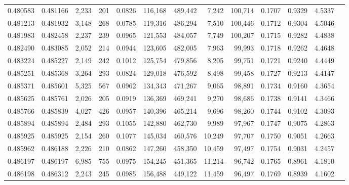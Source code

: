 \begin{tabular}{rrrrrrrrrrrrr}
0.480583 & 0.481166 &  2,233 &   201 &                                     0.0826 & 116,168 & 489,442 &   7,242 & 100,714 & 0.1707 & 0.9329 & 4.5337 \\
0.481213 & 0.481932 &  3,148 &   268 &                                     0.0785 & 119,316 & 486,294 &   7,510 & 100,446 & 0.1712 & 0.9304 & 4.5046 \\
0.481983 & 0.482458 &  2,237 &   239 &                                     0.0965 & 121,553 & 484,057 &   7,749 & 100,207 & 0.1715 & 0.9282 & 4.4838 \\
0.482490 & 0.483085 &  2,052 &   214 &                                     0.0944 & 123,605 & 482,005 &   7,963 &  99,993 & 0.1718 & 0.9262 & 4.4648 \\
0.483224 & 0.485227 &  2,149 &   242 &                                     0.1012 & 125,754 & 479,856 &   8,205 &  99,751 & 0.1721 & 0.9240 & 4.4449 \\
0.485251 & 0.485368 &  3,264 &   293 &                                     0.0824 & 129,018 & 476,592 &   8,498 &  99,458 & 0.1727 & 0.9213 & 4.4147 \\
0.485371 & 0.485601 &  5,325 &   567 &                                     0.0962 & 134,343 & 471,267 &   9,065 &  98,891 & 0.1734 & 0.9160 & 4.3654 \\
0.485625 & 0.485761 &  2,026 &   205 &                                     0.0919 & 136,369 & 469,241 &   9,270 &  98,686 & 0.1738 & 0.9141 & 4.3466 \\
0.485766 & 0.485839 &  4,027 &   426 &                                     0.0957 & 140,396 & 465,214 &   9,696 &  98,260 & 0.1744 & 0.9102 & 4.3093 \\
0.485894 & 0.485894 &  2,484 &   293 &                                     0.1055 & 142,880 & 462,730 &   9,989 &  97,967 & 0.1747 & 0.9075 & 4.2863 \\
0.485925 & 0.485925 &  2,154 &   260 &                                     0.1077 & 145,034 & 460,576 &  10,249 &  97,707 & 0.1750 & 0.9051 & 4.2663 \\
0.485962 & 0.486188 &  2,226 &   210 &                                     0.0862 & 147,260 & 458,350 &  10,459 &  97,497 & 0.1754 & 0.9031 & 4.2457 \\
0.486197 & 0.486197 &  6,985 &   755 &                                     0.0975 & 154,245 & 451,365 &  11,214 &  96,742 & 0.1765 & 0.8961 & 4.1810 \\
0.486198 & 0.486312 &  2,243 &   245 &                                     0.0985 & 156,488 & 449,122 &  11,459 &  96,497 & 0.1769 & 0.8939 & 4.1602 \\

\end{tabular}
